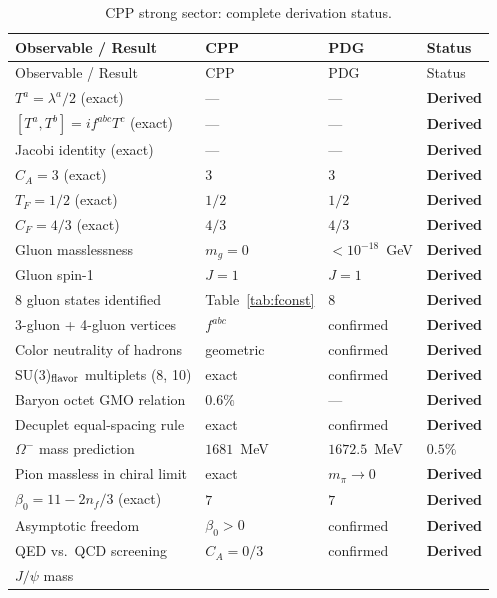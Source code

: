 \documentclass[11pt,a4paper]{article}
\begin{document}
\begin{longtable}{@{}p{5.5cm}p{2.5cm}p{2.5cm}l@{}}
\caption{CPP strong sector: complete derivation status.}
\label{tab:status}\\
\toprule
Observable / Result & CPP & PDG & Status \\
\midrule
\endfirsthead
\toprule
Observable / Result & CPP & PDG & Status \\
\midrule
\endhead
\bottomrule
\endfoot
$T^a = \lambda^a/2$ (exact)
  & --- & --- & \textbf{Derived} \\
$[T^a,T^b]=if^{abc}T^c$ (exact)
  & --- & --- & \textbf{Derived} \\
Jacobi identity (exact)
  & --- & --- & \textbf{Derived} \\
$C_A = 3$ (exact)
  & $3$ & $3$ & \textbf{Derived} \\
$T_F = 1/2$ (exact)
  & $1/2$ & $1/2$ & \textbf{Derived} \\
$C_F = 4/3$ (exact)
  & $4/3$ & $4/3$ & \textbf{Derived} \\
Gluon masslessness
  & $m_g=0$ & $<10^{-18}$~GeV & \textbf{Derived} \\
Gluon spin-1
  & $J=1$ & $J=1$ & \textbf{Derived} \\
8 gluon states identified
  & Table~\ref{tab:fconst} & 8 & \textbf{Derived} \\
3-gluon + 4-gluon vertices
  & $f^{abc}$ & confirmed & \textbf{Derived} \\
Color neutrality of hadrons
  & geometric & confirmed & \textbf{Derived} \\
SU(3)$_{\rm flavor}$ multiplets (8, 10)
  & exact & confirmed & \textbf{Derived} \\
Baryon octet GMO relation
  & $0.6\%$ & --- & \textbf{Derived} \\
Decuplet equal-spacing rule
  & exact & confirmed & \textbf{Derived} \\
$\Omega^-$ mass prediction
  & $1681$~MeV & $1672.5$~MeV & $0.5\%$ \\
Pion massless in chiral limit
  & exact & $m_\pi\to0$ & \textbf{Derived} \\
$\beta_0 = 11-2n_f/3$ (exact)
  & $7$ & $7$ & \textbf{Derived} \\
Asymptotic freedom
  & $\beta_0>0$ & confirmed & \textbf{Derived} \\
QED vs.\ QCD screening
  & $C_A=0/3$ & confirmed & \textbf{Derived} \\
$J/\psi$ mass

\end{longtable}
\end{document}
